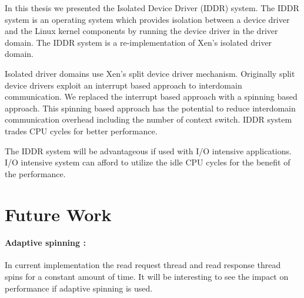
In this thesis we presented the Isolated Device Driver (IDDR) system. The IDDR system is an operating system which provides isolation between a device driver and the Linux kernel components by running the device driver in the driver domain. The IDDR system is a re-implementation of Xen's isolated driver domain.

Isolated driver domains use Xen's split device driver mechanism. Originally split device drivers exploit an interrupt based approach to interdomain communication. We replaced the interrupt based approach with a spinning based approach. This spinning based approach has the potential to reduce interdomain communication overhead including the number of context switch. IDDR system trades CPU cycles for better performance.

The IDDR system will be advantageous if used with I/O intensive applications. I/O intensive system can afford to utilize the idle CPU cycles for the benefit of the performance. 

\section{Future Work}
\paragraph{Adaptive spinning : }
In current implementation the read request thread and read response thread spins for a constant amount of time. It will be interesting to see the impact on performance if adaptive spinning is used.
